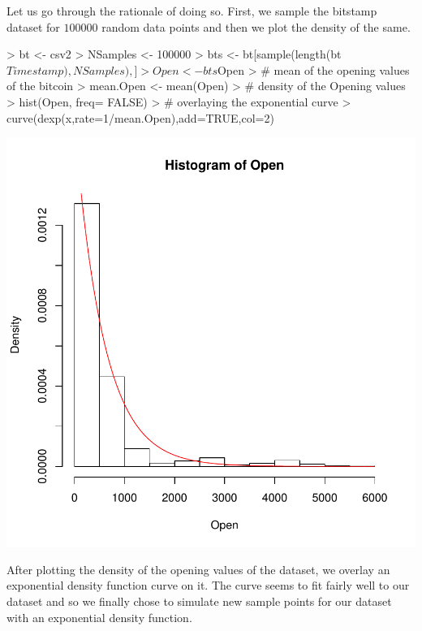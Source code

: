 \documentclass{article}
\begin{document}
Let us go through the rationale of doing so. First, we sample the bitstamp dataset for $100000$ random data points and then we plot the density of the same.

\begin{Schunk}
\begin{Sinput}
> bt <- csv2
> NSamples <- 100000
> bts <- bt[sample(length(bt$Timestamp),NSamples),]
> Open <- bts$Open
> # mean of the opening values of the bitcoin
> mean.Open <- mean(Open) 
> # density of the Opening values
> hist(Open, freq= FALSE)   
> # overlaying the exponential curve
> curve(dexp(x,rate=1/mean.Open),add=TRUE,col=2)   
\end{Sinput}
\end{Schunk}
\includegraphics{Report-006}

After plotting the density of the opening values of the dataset, we overlay an exponential density function curve on it. The curve seems to fit fairly well to our dataset and so we finally chose to simulate new sample points for our dataset with an exponential density function.

\begin{Schunk}
\end{Schunk}
\end{document}
